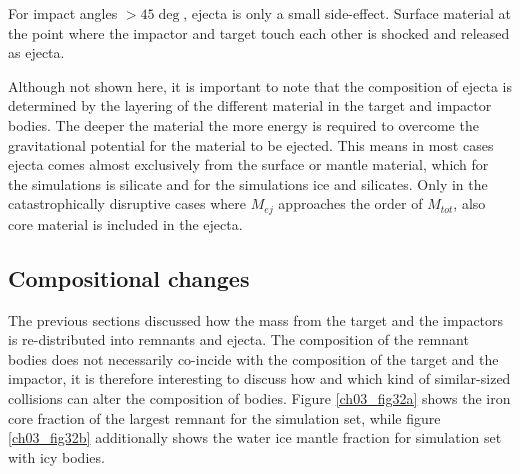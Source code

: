 
For impact angles $>  45\deg$, ejecta is only a small side-effect. Surface material at the point where the impactor and target touch each other is shocked and released as ejecta. 

Although not shown here, it is important to note that the composition of ejecta is determined by the layering of the different material in the target and impactor bodies. The deeper the material the more energy is required to overcome the gravitational potential for the material to be ejected. This means in most cases ejecta comes almost exclusively from the surface or mantle material, which for the \css simulations is silicate and for the \iss simulations ice and silicates. Only in the catastrophically disruptive cases where $M_{ej}$ approaches the order of $M_{tot}$, also core material is included in the ejecta.

\subsection{Compositional changes}
The previous sections discussed how the mass from the target and the impactors is re-distributed into remnants and ejecta. The composition of the remnant bodies does not necessarily co-incide with the composition of the target and the impactor, it is therefore interesting to discuss how and which kind of similar-sized collisions can alter the composition of bodies. Figure \ref{ch03_fig32a} shows the iron core fraction of the largest remnant for the \css simulation set, while figure \ref{ch03_fig32b} additionally shows the water ice mantle fraction for simulation set \iss with icy bodies.

